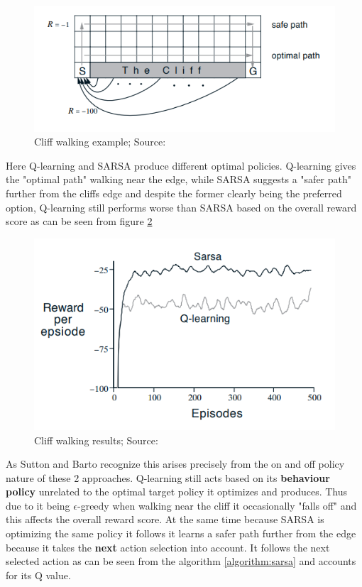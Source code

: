 \begin{figure}[H]
\centering
\includegraphics[scale=0.6]{figures/cliff_scheme.PNG}
  \caption{Cliff walking example; Source: \cite{sutton_barto}}
  \label{fig:cliff}
\end{figure}

Here Q-learning and SARSA produce different optimal policies. Q-learning gives the "optimal path" walking near the edge, while SARSA suggests a "safer path" further
from the cliffs edge and despite the former clearly 
being the preferred option, Q-learning still performs 
worse than SARSA based on the overall reward score as can be seen from figure \ref{fig:cliff_score}

\begin{figure}[H]
\centering
\includegraphics[scale=0.6]{figures/cliff_score.PNG}
  \caption{Cliff walking results; Source: \cite{sutton_barto}}
  \label{fig:cliff_score}
\end{figure}

As Sutton and Barto recognize \cite{sutton_barto} this 
arises precisely from the on and off policy nature of 
these 2 approaches. Q-learning still acts based on its
\textbf{behaviour policy} unrelated to the optimal target policy it optimizes and produces. Thus due to it being $\epsilon$-greedy when walking near the cliff it occasionally "falls off" and this affects the overall
reward score.  At the same time because SARSA is 
optimizing the same policy it follows it learns a safer
path further from the edge because it takes the \textbf{next} action selection into account. 
It follows the next selected action as can be seen from the 
algorithm \ref{algorithm:sarsa} and accounts for its Q value.

